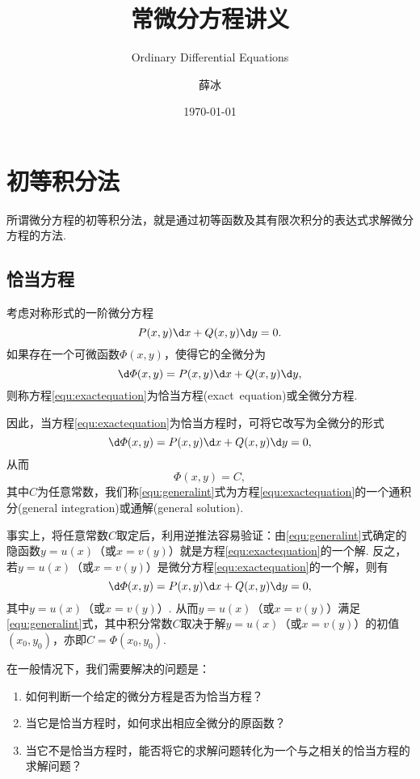 \documentclass[lang=cn,10pt]{elegantbook}
\title{常微分方程讲义}
\subtitle{Ordinary Differential Equations}
\author{薛冰}
\date{\today}
\begin{document}
	\maketitle
	
	\frontmatter
	\tableofcontents
	\mainmatter
	
	
	\newpage
	
\chapter{初等积分法}
所谓微分方程的初等积分法，就是通过初等函数及其有限次积分的表达式求解微分方程的方法.
\section{恰当方程}
\begin{definition}[恰当方程]
	考虑对称形式的一阶微分方程
	\begin{equation}\label{equ:exactequation}
		P(x,y)\d x+Q(x,y)\d y=0.
	\end{equation}
	如果存在一个可微函数$\varPhi(x,y)$，使得它的全微分为
	$$\d \varPhi(x,y)=P(x,y)\d x+Q(x,y)\d y,$$
	则称方程\ref{equ:exactequation}为{\heiti 恰当方程}(exact\ equation)或{\heiti 全微分方程}.
\end{definition}
因此，当方程\ref{equ:exactequation}为恰当方程时，可将它改写为全微分的形式
$$\d\varPhi(x,y)=P(x,y)\d x+Q(x,y)\d y=0,$$
从而
\begin{equation}\label{equ:generalint}
	\varPhi(x,y)=C,
\end{equation}
其中$C$为任意常数，我们称\ref{equ:generalint}式为方程\ref{equ:exactequation}的一个{\heiti 通积分}(general integration)或{\heiti 通解}(general solution).

事实上，将任意常数$C$取定后，利用逆推法容易验证：由\ref{equ:generalint}式确定的隐函数$y=u(x)$（或$x=v(y)$）就是方程\ref{equ:exactequation}的一个解. 反之，若$y=u(x)$（或$x=v(y)$）是微分方程\ref{equ:exactequation}的一个解，则有
$$\d\varPhi(x,y)=P(x,y)\d x+Q(x,y)\d y=0,$$
其中$y=u(x)$（或$x=v(y)$）. 从而$y=u(x)$（或$x=v(y)$）满足\ref{equ:generalint}式，其中积分常数$C$取决于解$y=u(x)$（或$x=v(y)$）的初值$(x_0,y_0)$，亦即$C=\varPhi(x_0,y_0)$.

在一般情况下，我们需要解决的问题是：
\begin{enumerate}[(1)]
	\item 如何判断一个给定的微分方程是否为恰当方程？
	\item 当它是恰当方程时，如何求出相应全微分的原函数？
	\item 当它不是恰当方程时，能否将它的求解问题转化为一个与之相关的恰当方程的求解问题？
\end{enumerate}
\end{document}
